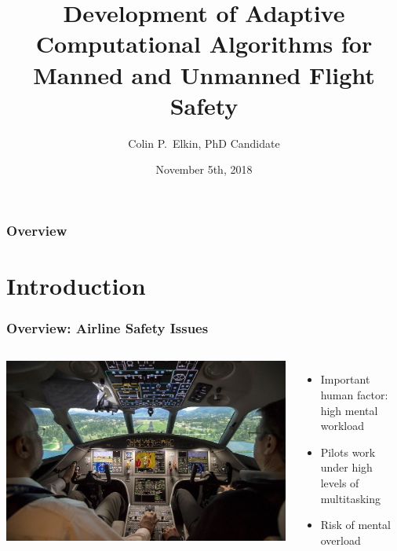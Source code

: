 \documentclass{beamer}
\title[Computational Algorithms for Flight Safety]{Development of Adaptive Computational Algorithms for Manned and Unmanned Flight Safety}
\author{Colin P.~Elkin, PhD Candidate} %
\institute[UT] %
{
Committee Chair: Dr.~Vijay Devabhaktuni \\
Committee Member: Dr.~Mansoor Alam \\ 
Committee Member: Dr.~Ahmad Javaid \\ 
Committee Member: Dr.~Devinder Kaur \\
Committee Member: Dr.~Weiqing Sun \\ 
Committee Member: Dr.~Lawrence Thomas \\
\medskip
Department of EECS, The University of Toledo 
}
\date{November 5th, 2018} %
\begin{document}
\begin{frame}
\titlepage %
\end{frame}

\begin{frame}
\frametitle{Overview} %
\tableofcontents %
\end{frame}


\section{Introduction} 


\begin{frame}
\frametitle{Overview: Airline Safety Issues}
\begin{columns}[c]
\includegraphics[width=\textwidth]{flight}
\begin{itemize}
\item{Important human factor: high mental workload}
\item{Pilots work under high levels of multitasking}
\item{Risk of mental overload}
\end{itemize}
\end{columns}
\end{frame}
\end{document}
